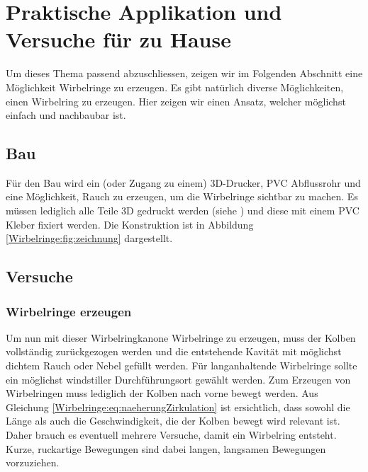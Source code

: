 %
%
%
\section{Praktische Applikation und Versuche für zu Hause}

Um dieses Thema passend abzuschliessen, zeigen wir im Folgenden Abschnitt eine Möglichkeit Wirbelringe zu erzeugen.
Es gibt natürlich diverse Möglichkeiten, einen Wirbelring zu erzeugen. 
Hier zeigen wir einen Ansatz, welcher möglichst einfach und nachbaubar ist.

\subsection{Bau}


Für den Bau wird ein (oder Zugang zu einem) 3D-Drucker,  PVC Abflussrohr und eine Möglichkeit, Rauch zu erzeugen, um die Wirbelringe sichtbar zu machen. 
Es müssen lediglich alle Teile 3D gedruckt werden (siehe \cite{Wirbelringe:3D_modelle}) und diese mit einem PVC Kleber fixiert werden. 
Die Konstruktion ist in Abbildung \ref{Wirbelringe:fig:zeichnung} dargestellt.

\subsection{Versuche}

\subsubsection{Wirbelringe erzeugen \label{Wirbelringe:wirbelringeerzeugen}}

Um nun mit dieser Wirbelringkanone Wirbelringe zu erzeugen, muss der Kolben vollständig zurückgezogen werden und die entstehende Kavität mit möglichst dichtem Rauch oder Nebel gefüllt werden.
Für langanhaltende Wirbelringe sollte ein möglichst windstiller Durchführungsort gewählt werden.
Zum Erzeugen von Wirbelringen muss lediglich der Kolben nach vorne bewegt werden.
Aus Gleichung \eqref{Wirbelringe:eq:naeherungZirkulation} ist ersichtlich, dass sowohl die Länge als auch die Geschwindigkeit, die der Kolben bewegt wird relevant ist.
Daher brauch es eventuell mehrere Versuche, damit ein Wirbelring entsteht.
Kurze, ruckartige Bewegungen sind dabei langen, langsamen Bewegungen vorzuziehen.


